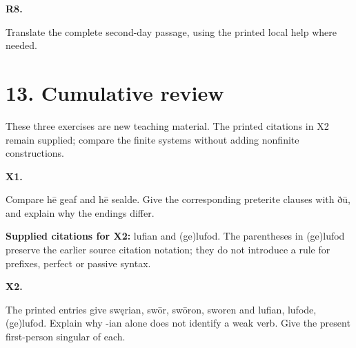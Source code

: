 \par\begin{minipage}{\linewidth}\raggedright
\textbf{R8.}

Translate the complete second-day passage, using the printed local help where needed.

\end{minipage}\par\addvspace{4pt}

\clearpage
\section*{13. Cumulative review}

These three exercises are new teaching material. The printed citations in X2 remain supplied; compare the finite systems without adding nonfinite constructions.

\par\begin{minipage}{\linewidth}\raggedright
\textbf{X1.}

Compare hē geaf and hē sealde. Give the corresponding preterite clauses with ðū, and explain why the endings differ.

\end{minipage}\par\addvspace{4pt}

\textbf{Supplied citations for X2:} lufian and (ge)lufod. The parentheses in (ge)lufod preserve the earlier source citation notation; they do not introduce a rule for prefixes, perfect or passive syntax.

\par\begin{minipage}{\linewidth}\raggedright
\textbf{X2.}

The printed entries give swęrian, swōr, swōron, sworen and lufian, lufode, (ge)lufod. Explain why -ian alone does not identify a weak verb. Give the present first-person singular of each.

\end{minipage}\par\addvspace{4pt}

